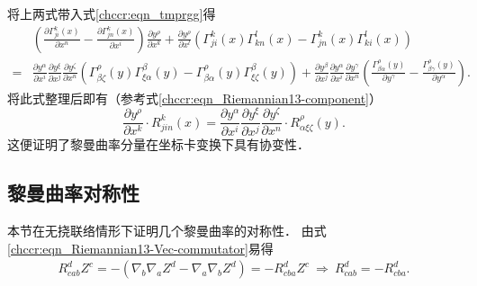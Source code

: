 将上两式带入式\eqref{chccr:eqn_tmprgg}得
\setlength{\mathindent}{0em}
\begin{align*}
    &\left(\frac{\partial \Gamma^{k}_{ji}(x)} {\partial x^n} -\frac{\partial \Gamma^{k}_{jn}(x)}{\partial x^i}\right)
    \frac{\partial y^\rho}{\partial x^k} +
\frac{\partial y^\rho}{\partial x^l} \left(\Gamma^{k}_{ji}(x)\Gamma^{l}_{kn}(x)
- \Gamma^{k}_{jn}(x) \Gamma^{l}_{ki}(x) \right) \\
    =& \frac{\partial y^\alpha}{\partial x^i}
    \frac{\partial y^\xi}{\partial x^j}  \frac{\partial y^\zeta}{\partial x^n}
    \left(\Gamma^{\rho}_{\beta\zeta}(y) \Gamma^{\beta}_{\xi\alpha}(y)
    -\Gamma^{\rho}_{\beta\alpha}(y) \Gamma^{\beta}_{\xi\zeta}(y)\right)
    +\frac{\partial y^\beta}{\partial x^j} \frac{\partial y^\alpha}
    {\partial x^i} \frac{\partial y^\gamma}{\partial x^n}
    \left( \frac{\Gamma^{\rho}_{\beta\alpha}(y)}{\partial y^\gamma}
    - \frac{\Gamma^{\rho}_{\beta\gamma}(y)}{\partial y^\alpha} \right) .
\end{align*}\setlength{\mathindent}{2em}
将此式整理后即有（参考式\eqref{chccr:eqn_Riemannian13-component}）
\begin{equation}
     \frac{\partial y^\rho}{\partial x^k} \cdot R^{k}_{jin}(x) =
     \frac{\partial y^\alpha}{\partial x^i} \frac{\partial y^\xi}{\partial x^j}
     \frac{\partial y^\zeta}{\partial x^n} \cdot R^{\rho}_{\alpha\xi\zeta}(y)     .
\end{equation}
这便证明了黎曼曲率分量在坐标卡变换下具有协变性．

\subsection{黎曼曲率对称性}\label{chccr:sec_riemann-sym}
本节在{\kaishu 无挠联络}情形下证明几个黎曼曲率的对称性．
由式\eqref{chccr:eqn_Riemannian13-Vec-commutator}易得
\begin{align}
    R_{cab}^d Z^c =- (\nabla_b \nabla_a Z^d -\nabla_a \nabla_b Z^d)=-R_{cba}^d Z^c 
    \ \Rightarrow \ R_{cab}^d= -R_{cba}^d . \label{chccr:eqn_Rab=-Rba}
\end{align}


